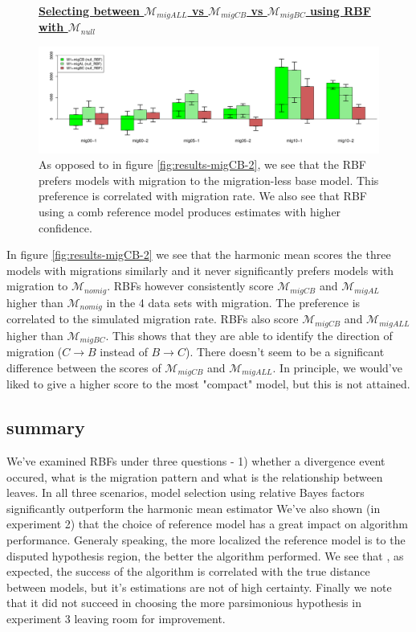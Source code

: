 \documentclass[11pt]{article}
\newcommand{\M}{\mathcal{M}}
\newcommand{\1}{\mathbbm{1}}
\newcommand{\figuretitle}[1]{
	\centering
	\underline{\textbf{#1}}
	\par
	\medskip
}
\begin{document}
\begin{figure}[H]

\figuretitle{Selecting between $\M_{migALL}$ vs $\M_{migCB}$ vs $\M_{migBC}$ using RBF with $\M_{null}$}


\includegraphics[width=1.0\textwidth]{results/results-migCB-select-1}
\captionsetup{width=1.0\textwidth}
\caption{
As opposed to in figure \ref{fig:results-migCB-2}, we see that the RBF prefers models with migration to the migration-less base model. 
%
This preference is correlated with migration rate. 
%
We also see that RBF using a comb reference model produces estimates with higher confidence.
}
\label{fig:results-migCB-1}
\end{figure}



In figure \ref{fig:results-migCB-2} we see that the harmonic mean scores the three models with migrations similarly and it never significantly prefers models with migration to $\M_{nomig}$.
%
RBFs however consistently score $\M_{migCB}$ and $\M_{migAL}$ higher than $\M_{nomig}$ in the 4 data sets with migration. The preference is correlated to the simulated migration rate. 
%
RBFs also score $\M_{migCB}$ and $\M_{migALL}$ higher than $\M_{migBC}$. This shows that they are able to identify the direction of migration ($C\rightarrow B$ instead of $B \rightarrow C$).
%
There doesn't seem to be a significant difference between the scores of $\M_{migCB}$ and $\M_{migALL}$. In principle, we would've liked to give a higher score to the most "compact" model, but this is not attained.



\subsection{summary}

We've examined RBFs under three questions - 1) whether a divergence event occured, what is the migration pattern and what is the relationship between leaves. In all three scenarios, model selection using relative Bayes factors significantly outperform the harmonic mean estimator
%
We've also shown (in experiment 2) that the choice of reference model has a great impact on algorithm performance. Generaly speaking, the more localized the reference model is to the disputed hypothesis region, the better the algorithm performed. 
%
We see that , as expected, the success of the algorithm is correlated with the true distance between models, but it's estimations are not of high certainty.
%
Finally we note that it did not succeed in choosing the more parsimonious hypothesis in experiment 3 leaving room for improvement.
\end{document}
